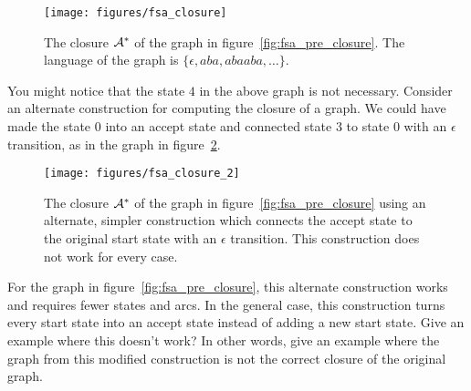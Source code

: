 \begin{figure}
    \centering
    \texttt{[image: figures/fsa\_closure]}
    \caption{The closure $\mathcal{A}^*$ of the graph in
    figure~\ref{fig:fsa_pre_closure}. The language of the graph is $\{\epsilon,
    aba, abaaba, \ldots\}$.}
    \label{fig:fsa_closure}
\end{figure}

\begin{example}
You might notice that the state $4$ in the above graph is not necessary.
Consider an alternate construction for computing the closure of a graph. We
could have made the state $0$ into an accept state and connected state $3$
to state $0$ with an $\epsilon$ transition, as in the graph in
figure~\ref{fig:fsa_closure_2}.

\begin{figure}
    \centering
    \texttt{[image: figures/fsa\_closure\_2]}
    \caption{The closure $\mathcal{A}^*$ of the graph in
    figure~\ref{fig:fsa_pre_closure} using an alternate, simpler construction
    which connects the accept state to the original start state with an
    $\epsilon$ transition. This construction does not work for every case.}
    \label{fig:fsa_closure_2}
\end{figure}

For the graph in figure~\ref{fig:fsa_pre_closure}, this alternate construction
works and requires fewer states and arcs. In the general case, this
construction turns every start state into an accept state instead of adding
a new start state. Give an example where this doesn't work? In other words,
give an example where the graph from this modified construction is not the
correct closure of the original graph.
\end{example}

